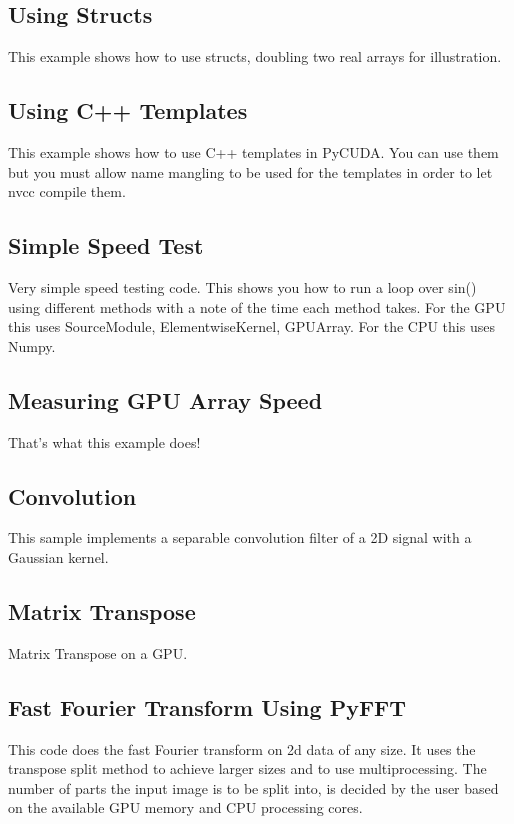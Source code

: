 \documentclass[article,A4,12pt]{llncs}
\begin{document}
\subsection{Using Structs}

This example shows how to use structs, doubling two real arrays for illustration.

\subsection{Using C++ Templates}

This example shows how to use C++ templates in PyCUDA.
You can use them but you must allow 
name mangling to be used for the templates in order to let nvcc 
compile them. 

\subsection{Simple Speed Test}

Very simple speed testing code. This shows you how to run a loop over sin() using different 
methods with a note of the time each method takes. For the GPU this uses SourceModule, 
ElementwiseKernel, GPUArray. For the CPU this uses Numpy.

\subsection{Measuring GPU Array Speed}

That's what this example does!

\subsection{Convolution}

This sample implements a separable convolution filter of a 2D signal with a Gaussian kernel.

\subsection{Matrix Transpose}

Matrix Transpose on a GPU.

\subsection{Fast Fourier Transform Using PyFFT }

This code does the fast Fourier transform on 2d data of any size. 
 It uses the transpose split method to achieve larger sizes and to
 use multiprocessing. The number of parts the input image is to be 
 split into, is decided by the user based on the available GPU memory 
 and CPU processing cores. 
\end{document}
